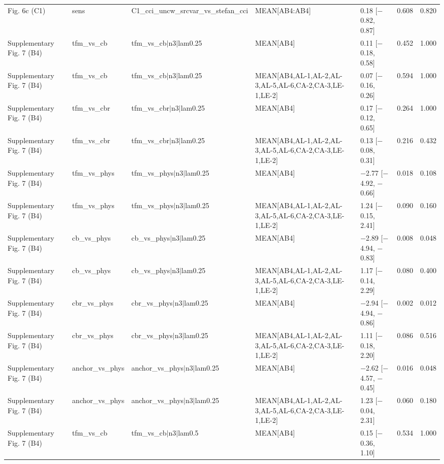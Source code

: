 \begin{longtable}{lllllrr}
Fig. 6c (C1) & sens & C1\_cci\_uncw\_srcvar\_vs\_stefan\_cci & MEAN[AB4:AB4] & 0.18 [$-$0.82, 0.87] & 0.608 & 0.820 \\
Supplementary Fig. 7 (B4) & tfm\_vs\_cb & tfm\_vs\_cb$|$n3$|$lam0.25 & MEAN[AB4] & 0.11 [$-$0.18, 0.58] & 0.452 & 1.000 \\
Supplementary Fig. 7 (B4) & tfm\_vs\_cb & tfm\_vs\_cb$|$n3$|$lam0.25 & MEAN[AB4,AL-1,AL-2,AL-3,AL-5,AL-6,CA-2,CA-3,LE-1,LE-2] & 0.07 [$-$0.16, 0.26] & 0.594 & 1.000 \\
Supplementary Fig. 7 (B4) & tfm\_vs\_cbr & tfm\_vs\_cbr$|$n3$|$lam0.25 & MEAN[AB4] & 0.17 [$-$0.12, 0.65] & 0.264 & 1.000 \\
Supplementary Fig. 7 (B4) & tfm\_vs\_cbr & tfm\_vs\_cbr$|$n3$|$lam0.25 & MEAN[AB4,AL-1,AL-2,AL-3,AL-5,AL-6,CA-2,CA-3,LE-1,LE-2] & 0.13 [$-$0.08, 0.31] & 0.216 & 0.432 \\
Supplementary Fig. 7 (B4) & tfm\_vs\_phys & tfm\_vs\_phys$|$n3$|$lam0.25 & MEAN[AB4] & $-$2.77 [$-$4.92, $-$0.66] & 0.018 & 0.108 \\
Supplementary Fig. 7 (B4) & tfm\_vs\_phys & tfm\_vs\_phys$|$n3$|$lam0.25 & MEAN[AB4,AL-1,AL-2,AL-3,AL-5,AL-6,CA-2,CA-3,LE-1,LE-2] & 1.24 [$-$0.15, 2.41] & 0.090 & 0.160 \\
Supplementary Fig. 7 (B4) & cb\_vs\_phys & cb\_vs\_phys$|$n3$|$lam0.25 & MEAN[AB4] & $-$2.89 [$-$4.94, $-$0.83] & 0.008 & 0.048 \\
Supplementary Fig. 7 (B4) & cb\_vs\_phys & cb\_vs\_phys$|$n3$|$lam0.25 & MEAN[AB4,AL-1,AL-2,AL-3,AL-5,AL-6,CA-2,CA-3,LE-1,LE-2] & 1.17 [$-$0.14, 2.29] & 0.080 & 0.400 \\
Supplementary Fig. 7 (B4) & cbr\_vs\_phys & cbr\_vs\_phys$|$n3$|$lam0.25 & MEAN[AB4] & $-$2.94 [$-$4.94, $-$0.86] & 0.002 & 0.012 \\
Supplementary Fig. 7 (B4) & cbr\_vs\_phys & cbr\_vs\_phys$|$n3$|$lam0.25 & MEAN[AB4,AL-1,AL-2,AL-3,AL-5,AL-6,CA-2,CA-3,LE-1,LE-2] & 1.11 [$-$0.18, 2.20] & 0.086 & 0.516 \\
Supplementary Fig. 7 (B4) & anchor\_vs\_phys & anchor\_vs\_phys$|$n3$|$lam0.25 & MEAN[AB4] & $-$2.62 [$-$4.57, $-$0.45] & 0.016 & 0.048 \\
Supplementary Fig. 7 (B4) & anchor\_vs\_phys & anchor\_vs\_phys$|$n3$|$lam0.25 & MEAN[AB4,AL-1,AL-2,AL-3,AL-5,AL-6,CA-2,CA-3,LE-1,LE-2] & 1.23 [$-$0.04, 2.31] & 0.060 & 0.180 \\
Supplementary Fig. 7 (B4) & tfm\_vs\_cb & tfm\_vs\_cb$|$n3$|$lam0.5 & MEAN[AB4] & 0.15 [$-$0.36, 1.10] & 0.534 & 1.000 \\

\end{longtable}

